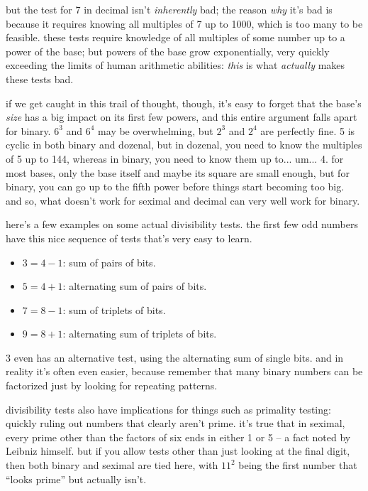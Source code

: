 \documentclass[../best.tex]{subfiles}
\begin{document}
but the test for 7 in decimal isn't \emph{inherently} bad; the reason \emph{why} it's bad is because it requires knowing all multiples of 7 up to 1000, which is too many to be feasible. these tests require knowledge of all multiples of some number up to a power of the base; but powers of the base grow exponentially, very quickly exceeding the limits of human arithmetic abilities: \emph{this} is what \emph{actually} makes these tests bad.

if we get caught in this trail of thought, though, it's easy to forget that the base's \emph{size} has a big impact on its first few powers, and this entire argument falls apart for binary. $6^3$ and $6^4$ may be overwhelming, but $2^3$ and $2^4$ are perfectly fine. 5 is cyclic in both binary and dozenal, but in dozenal, you need to know the multiples of 5 up to 144, whereas in binary, you need to know them up to... um... 4.\myfootnote{} for most bases, only the base itself and maybe its square are small enough, but for binary, you can go up to the fifth power before things start becoming too big. and so, what doesn't work for seximal and decimal can very well work for binary.

here's a few examples on some actual divisibility tests. the first few odd numbers have this nice sequence of tests that's very easy to learn.

\begin{itemize}
	\item $3 = 4 - 1$: sum of pairs of bits.
	\item $5 = 4 + 1$: alternating sum of pairs of bits.
	\item $7 = 8 - 1$: sum of triplets of bits.
	\item $9 = 8 + 1$: alternating sum of triplets of bits.
\end{itemize}

3 even has an alternative test, using the alternating sum of single bits. and in reality it's often even easier, because remember that many binary numbers can be factorized just by looking for repeating patterns.\myfootnote{}

divisibility tests also have implications for things such as primality testing: quickly ruling out numbers that clearly aren't prime. it's true that in seximal, every prime other than the factors of six ends in either 1 or 5 -- a fact noted by Leibniz himself.\myfootnote{} but if you allow tests other than just looking at the final digit, then both binary and seximal are tied here, with $11^2$ being the first number that ``looks prime'' but actually isn't.\myfootnote{}
\end{document}
